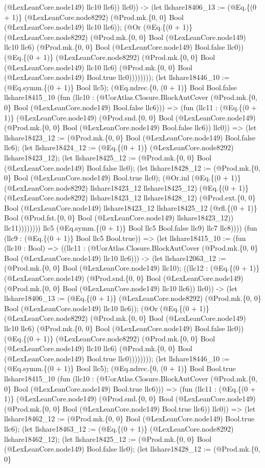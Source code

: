 \documentclass[11pt]{article}
\begin{document}
(@LexLeanCore.node149) llc10 llc6)) llc0)) -> (let llshare18406\_13 := (@Eq.\{(0 + 1)\} (@LexLeanCore.node8292) (@Prod.mk.\{0, 0\} Bool (@LexLeanCore.node149) llc10 llc6)); (@Or (@Eq.\{(0 + 1)\} (@LexLeanCore.node8292) (@Prod.mk.\{0, 0\} Bool (@LexLeanCore.node149) llc10 llc6) (@Prod.mk.\{0, 0\} Bool (@LexLeanCore.node149) Bool.false llc0)) (@Eq.\{(0 + 1)\} (@LexLeanCore.node8292) (@Prod.mk.\{0, 0\} Bool (@LexLeanCore.node149) llc10 llc6) (@Prod.mk.\{0, 0\} Bool (@LexLeanCore.node149) Bool.true llc0)))))))); (let llshare18446\_10 := (@Eq.symm.\{(0 + 1)\} Bool llc5); (@Eq.ndrec.\{0, (0 + 1)\} Bool Bool.false llshare18415\_10 (fun (llc10 : (@UorAtlas.Closure.BlockAutCover (@Prod.mk.\{0, 0\} Bool (@LexLeanCore.node149) Bool.false llc6))) => (fun (llc11 : (@Eq.\{(0 + 1)\} (@LexLeanCore.node149) (@Prod.snd.\{0, 0\} Bool (@LexLeanCore.node149) (@Prod.mk.\{0, 0\} Bool (@LexLeanCore.node149) Bool.false llc6)) llc0)) => (let llshare18423\_12 := (@Prod.mk.\{0, 0\} Bool (@LexLeanCore.node149) Bool.false llc6); (let llshare18424\_12 := (@Eq.\{(0 + 1)\} (@LexLeanCore.node8292) llshare18423\_12); (let llshare18425\_12 := (@Prod.mk.\{0, 0\} Bool (@LexLeanCore.node149) Bool.false llc0); (let llshare18428\_12 := (@Prod.mk.\{0, 0\} Bool (@LexLeanCore.node149) Bool.true llc0); (@Or.inl (@Eq.\{(0 + 1)\} (@LexLeanCore.node8292) llshare18423\_12 llshare18425\_12) (@Eq.\{(0 + 1)\} (@LexLeanCore.node8292) llshare18423\_12 llshare18428\_12) (@Prod.ext.\{0, 0\} Bool (@LexLeanCore.node149) llshare18423\_12 llshare18425\_12 (@rfl.\{(0 + 1)\} Bool (@Prod.fst.\{0, 0\} Bool (@LexLeanCore.node149) llshare18423\_12)) llc11)))))))) llc5 (@Eq.symm.\{(0 + 1)\} Bool llc5 Bool.false llc9) llc7 llc8)))) (fun (llc9 : (@Eq.\{(0 + 1)\} Bool llc5 Bool.true)) => (let llshare18415\_10 := (fun (llc10 : Bool) => ((llc11 : (@UorAtlas.Closure.BlockAutCover (@Prod.mk.\{0, 0\} Bool (@LexLeanCore.node149) llc10 llc6))) -> (let llshare12063\_12 := (@Prod.mk.\{0, 0\} Bool (@LexLeanCore.node149) llc10); ((llc12 : (@Eq.\{(0 + 1)\} (@LexLeanCore.node149) (@Prod.snd.\{0, 0\} Bool (@LexLeanCore.node149) (@Prod.mk.\{0, 0\} Bool (@LexLeanCore.node149) llc10 llc6)) llc0)) -> (let llshare18406\_13 := (@Eq.\{(0 + 1)\} (@LexLeanCore.node8292) (@Prod.mk.\{0, 0\} Bool (@LexLeanCore.node149) llc10 llc6)); (@Or (@Eq.\{(0 + 1)\} (@LexLeanCore.node8292) (@Prod.mk.\{0, 0\} Bool (@LexLeanCore.node149) llc10 llc6) (@Prod.mk.\{0, 0\} Bool (@LexLeanCore.node149) Bool.false llc0)) (@Eq.\{(0 + 1)\} (@LexLeanCore.node8292) (@Prod.mk.\{0, 0\} Bool (@LexLeanCore.node149) llc10 llc6) (@Prod.mk.\{0, 0\} Bool (@LexLeanCore.node149) Bool.true llc0)))))))); (let llshare18446\_10 := (@Eq.symm.\{(0 + 1)\} Bool llc5); (@Eq.ndrec.\{0, (0 + 1)\} Bool Bool.true llshare18415\_10 (fun (llc10 : (@UorAtlas.Closure.BlockAutCover (@Prod.mk.\{0, 0\} Bool (@LexLeanCore.node149) Bool.true llc6))) => (fun (llc11 : (@Eq.\{(0 + 1)\} (@LexLeanCore.node149) (@Prod.snd.\{0, 0\} Bool (@LexLeanCore.node149) (@Prod.mk.\{0, 0\} Bool (@LexLeanCore.node149) Bool.true llc6)) llc0)) => (let llshare18462\_12 := (@Prod.mk.\{0, 0\} Bool (@LexLeanCore.node149) Bool.true llc6); (let llshare18463\_12 := (@Eq.\{(0 + 1)\} (@LexLeanCore.node8292) llshare18462\_12); (let llshare18425\_12 := (@Prod.mk.\{0, 0\} Bool (@LexLeanCore.node149) Bool.false llc0); (let llshare18428\_12 := (@Prod.mk.\{0, 0\} 
\end{document}
